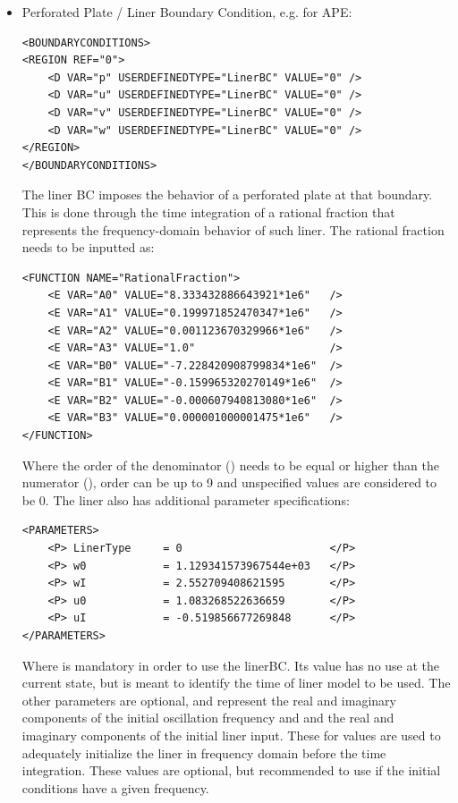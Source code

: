 \begin{itemize}
\item Perforated Plate / Liner Boundary Condition, e.g. for APE:
\begin{lstlisting}[style=XmlStyle]
<BOUNDARYCONDITIONS>
<REGION REF="0">
    <D VAR="p" USERDEFINEDTYPE="LinerBC" VALUE="0" />
    <D VAR="u" USERDEFINEDTYPE="LinerBC" VALUE="0" />
    <D VAR="v" USERDEFINEDTYPE="LinerBC" VALUE="0" />
    <D VAR="w" USERDEFINEDTYPE="LinerBC" VALUE="0" />
</REGION>
</BOUNDARYCONDITIONS>
\end{lstlisting}
The liner BC imposes the behavior of a perforated plate at that boundary. This is done through the time integration of a rational fraction that represents the frequency-domain behavior of such liner. The rational fraction needs to be inputted as:
\begin{lstlisting}[style=XmlStyle]
<FUNCTION NAME="RationalFraction">
    <E VAR="A0" VALUE="8.333432886643921*1e6"   />
    <E VAR="A1" VALUE="0.199971852470347*1e6"   />
    <E VAR="A2" VALUE="0.001123670329966*1e6"   />
    <E VAR="A3" VALUE="1.0"                     />
    <E VAR="B0" VALUE="-7.228420908799834*1e6"  />
    <E VAR="B1" VALUE="-0.159965320270149*1e6"  />
    <E VAR="B2" VALUE="-0.000607940813080*1e6"  />
    <E VAR="B3" VALUE="0.000001000001475*1e6"   />
</FUNCTION>
\end{lstlisting}
Where the order of the denominator () needs to be equal or higher than the numerator (), order can be up to 9 and unspecified values are considered to be 0. The liner also has additional parameter specifications:
\begin{lstlisting}[style=XmlStyle]
<PARAMETERS>
    <P> LinerType     = 0                       </P>
    <P> w0            = 1.129341573967544e+03   </P>
    <P> wI            = 2.552709408621595       </P>
    <P> u0            = 1.083268522636659       </P>
    <P> uI            = -0.519856677269848      </P>
</PARAMETERS>
\end{lstlisting}
Where  is mandatory in order to use the linerBC. Its value has no use at the current state, but is meant to identify the time of liner model to be used. The other parameters are optional,  and  represent the real and imaginary components of the initial oscillation frequency and  and  the real and imaginary components of the initial liner input. These for values are used to adequately initialize the liner in frequency domain before the time integration. These values are optional, but recommended to use if the initial conditions have a given frequency.

\end{itemize}


